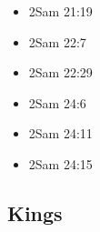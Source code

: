 \documentclass[14pt]{book}
\begin{document}
\begin{multicols}{2}
\begin{itemize}
							\item 2Sam 21:19
							
							\item 2Sam 22:7
							
							\item 2Sam 22:29
							
							\item 2Sam 24:6
							
							\item 2Sam 24:11
							
							\item 2Sam 24:15
							
										\end{itemize}\end{multicols}
						
					\subsection{Kings}
				
\end{document}
